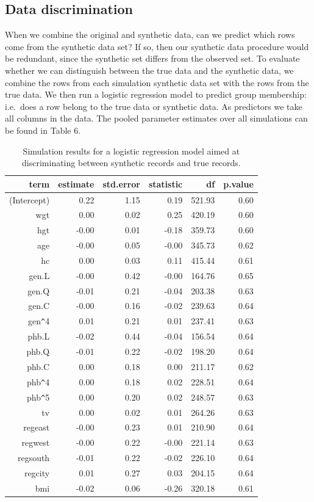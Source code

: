 \documentclass[psych,article,submit,moreauthors,pdftex]{mdpi}
\begin{document}
\hypertarget{data-discrimination}{%
\subsection{Data discrimination}\label{data-discrimination}}

When we combine the original and synthetic data, can we predict which
rows come from the synthetic data set? If so, then our synthetic data
procedure would be redundant, since the synthetic set differs from the
observed set. To evaluate whether we can distinguish between the true
data and the synthetic data, we combine the rows from each simulation
synthetic data set with the rows from the true data. We then run a
logistic regression model to predict group membership: i.e.~does a row
belong to the true data or synthetic data. As predictors we take all
columns in the data. The pooled parameter estimates over all simulations
can be found in Table 6.

\begin{table}[H]
\caption{Simulation results for a logistic regression model aimed at discriminating between synthetic records and true records.}
\centering
\begin{tabular}{rrrrrr}
  \hline
 term & estimate & std.error & statistic & df & p.value \\
  \hline
  (Intercept) & 0.22 & 1.15 & 0.19 & 521.93 & 0.60 \\ 
  wgt & 0.00 & 0.02 & 0.25 & 420.19 & 0.60 \\
  hgt & -0.00 & 0.01 & -0.18 & 359.73 & 0.60 \\
  age & -0.00 & 0.05 & -0.00 & 345.73 & 0.62 \\ 
  hc & 0.00 & 0.03 & 0.11 & 415.44 & 0.61\\
  gen.L & -0.00 & 0.42 & -0.00 & 164.76 & 0.65 \\
  gen.Q & -0.01 & 0.21 & -0.04 & 203.38 & 0.63 \\
  gen.C & -0.00 & 0.16 & -0.02 & 239.63 & 0.64 \\
  gen\verb|^|4 & 0.01 & 0.21 & 0.01 & 237.41 & 0.63 \\
  phb.L & -0.02 & 0.44 & -0.04 & 156.54 & 0.64 \\
  phb.Q & -0.01 & 0.22 & -0.02 & 198.20 & 0.64 \\
  phb.C & 0.00 & 0.18 & 0.00 & 211.17 & 0.62 \\
  phb\verb|^|4 & 0.00 & 0.18 & 0.02 & 228.51 & 0.64\\
  phb\verb|^|5 & 0.00 & 0.20 & 0.02 & 248.57 & 0.63\\
  tv & 0.00 & 0.02 & 0.01 & 264.26 & 0.63\\
  regeast & -0.00 & 0.23 & 0.01 & 210.90 & 0.64 \\ 
  regwest & -0.00 & 0.22 & -0.00 & 221.14 & 0.63 \\ 
  regsouth & -0.01 & 0.22 & -0.02 & 226.10 & 0.64 \\ 
  regcity & 0.01 & 0.27 & 0.03 & 204.15 & 0.64 \\ 
  bmi & -0.02 & 0.06 & -0.26 & 320.18 & 0.61 \\
   \hline
\end{tabular}
\end{table}
\end{document}
